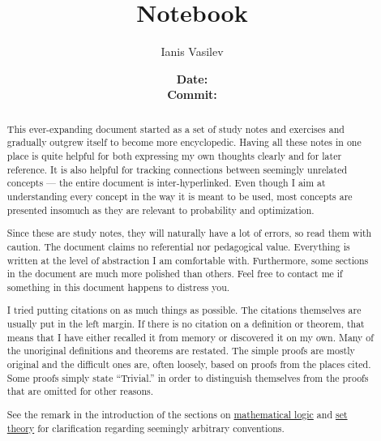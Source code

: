 \documentclass{notebook}
\title{Notebook}
\subtitle{\boldtt{\url{https://github.com/v--/notebook}}}
\author{Ianis Vasilev}
\date
  {
    \normalsize
    \textbf{Date:} \GitCommitInfoDate \\
    \textbf{Commit:} \texttt{\GitCommitInfoHash}
  }
\begin{document}
\maketitle

\begin{abstract}
  This ever-expanding document started as a set of study notes and exercises and gradually outgrew itself to become more encyclopedic. Having all these notes in one place is quite helpful for both expressing my own thoughts clearly and for later reference. It is also helpful for tracking connections between seemingly unrelated concepts --- the entire document is inter-hyperlinked. Even though I aim at understanding every concept in the way it is meant to be used, most concepts are presented insomuch as they are relevant to probability and optimization.

  Since these are study notes, they will naturally have a lot of errors, so read them with caution. The document claims no referential nor pedagogical value. Everything is written at the level of abstraction I am comfortable with. Furthermore, some sections in the document are much more polished than others. Feel free to contact me if something in this document happens to distress you.

  I tried putting citations on as much things as possible. The citations themselves are usually put in the left margin. If there is no citation on a definition or theorem, that means that I have either recalled it from memory or discovered it on my own. Many of the unoriginal definitions and theorems are restated. The simple proofs are mostly original and the difficult ones are, often loosely, based on proofs from the places cited. Some proofs simply state \enquote{Trivial.} in order to distinguish themselves from the proofs that are omitted for other reasons.

  See the remark in the introduction of the sections on \hyperref[sec:mathematical_logic]{mathematical logic} and \hyperref[sec:set_theory]{set theory} for clarification regarding seemingly arbitrary conventions.
\end{abstract}

\newpage
{}
\tableofcontents
\newpage















\end{document}
